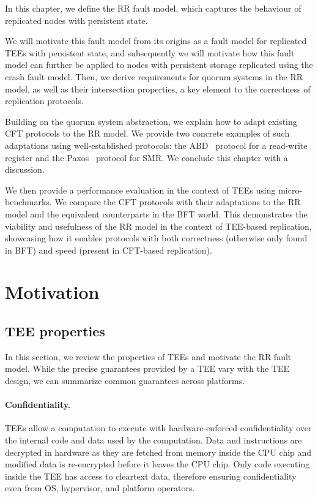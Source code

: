\label{chap:model}
\cleardoublepage{}

In this chapter, we define the \ac{RR} fault model, which
captures the behaviour of replicated nodes with persistent state.

We will motivate this fault model from its origins as a fault model
for replicated \acp{TEE} with persistent state, and subsequently
we will motivate how this fault model can further be applied to
nodes with persistent storage replicated using the crash fault
model. Then, we derive requirements for quorum systems in the
\ac{RR} model, as well as their intersection properties, a key element to the
correctness of replication protocols.

Building on the quorum system abstraction, we explain how to
adapt existing \ac{CFT} protocols to the \ac{RR} model. We
provide two concrete examples of such adaptations using
well-established protocols: the \ac{ABD}~\cite{abd} protocol for
a read-write register and the Paxos~\cite{paxos} protocol for
\ac{SMR}. We conclude this chapter with a discussion.

We then provide a performance evaluation in the context of
\acp{TEE} using micro-benchmarks. We compare the \ac{CFT}
protocols with their adaptations to the \ac{RR} model and the
equivalent counterparts in the \ac{BFT} world. This demonstrates
the viability and usefulness of the \ac{RR} model in the context
of \ac{TEE}-based replication, showcasing how it enables
protocols with both correctness (otherwise only found in
\ac{BFT}) and speed (present in \ac{CFT}-based replication).

\section{Motivation}\label{sec:motivation}

\subsection{\ac{TEE} properties}\label{ssec:tee_motivation}

In this section, we review the properties of \acp{TEE} and motivate the
\ac{RR} fault model. While the precise guarantees provided by a
\ac{TEE} vary with the \ac{TEE} design, we can summarize common guarantees across platforms.

\paragraph{Confidentiality.} \acp{TEE} allow a computation to execute with
hardware-enforced confidentiality over the internal code and data used
by the computation. Data and instructions are decrypted in hardware as
they are fetched from memory inside the CPU chip and modified data is
re-encrypted before it leaves the CPU chip. Only code executing inside
the \ac{TEE} has access to cleartext data, therefore ensuring
confidentiality even from \ac{OS}, hypervisor, and platform
operators.

